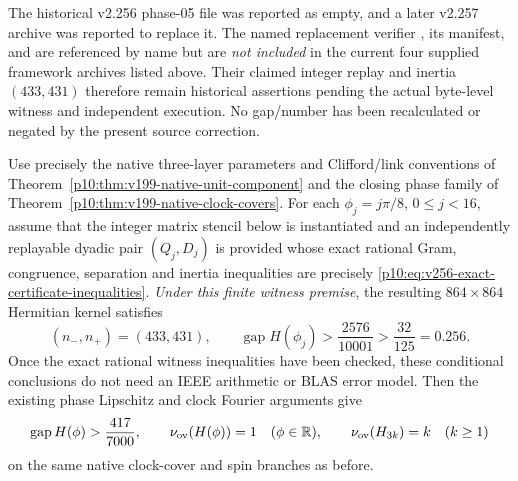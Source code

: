 \documentclass[12pt,a4paper]{article}
\begin{document}
\begin{remark}
\label{p10:rem:v258-phase05-payload}
The historical v2.256 phase-05 file was reported as empty, and a later
v2.257 archive was reported to replace it.
The named replacement verifier
, its manifest,
and 
are referenced by name but are \emph{not included} in the current four
supplied framework archives listed above. Their claimed integer replay and
inertia $(433,431)$ therefore remain historical assertions pending the
actual byte-level witness and independent execution. No gap/number has
been recalculated or negated by the present source correction.
\end{remark}

\begin{theorem}
\label{p10:thm:v256-exact-native-inertia}
Use precisely the native three-layer parameters and Clifford/link
conventions of Theorem~\ref{p10:thm:v199-native-unit-component} and the
closing phase family of Theorem~\ref{p10:thm:v199-native-clock-covers}.
For each $\phi_j=j\pi/8$, $0\le j<16$, assume that the integer
matrix stencil below is instantiated and an independently replayable dyadic
pair $(Q_j,D_j)$ is provided whose exact rational Gram, congruence,
separation and inertia inequalities are precisely
\eqref{p10:eq:v256-exact-certificate-inequalities}.
\emph{Under this finite witness premise}, the resulting
$864\times864$ Hermitian kernel satisfies
\begin{equation}
 (n_-,n_+)=(433,431),\qquad
 \operatorname{gap}H(\phi_j)>
 \frac{2576}{10001}>\frac{32}{125}=0.256.
 \label{p10:eq:v256-exact-mesh-gap}
\end{equation}
Once the exact rational witness inequalities have been checked, these
conditional conclusions do not need an IEEE arithmetic or BLAS error model.
Then the existing phase Lipschitz and clock Fourier arguments give
\begin{equation}
 \operatorname{gap}H(\phi)>\frac{417}{7000},\qquad
 \nu_{\rm ov}(H(\phi))=1\quad(\phi\in\mathbb R),
 \qquad
 \nu_{\rm ov}(H_{3k})=k\quad(k\ge1)
 \label{p10:eq:v256-exact-cover-index}
\end{equation}
on the same native clock-cover and spin branches as before.
\end{theorem}
\end{document}
